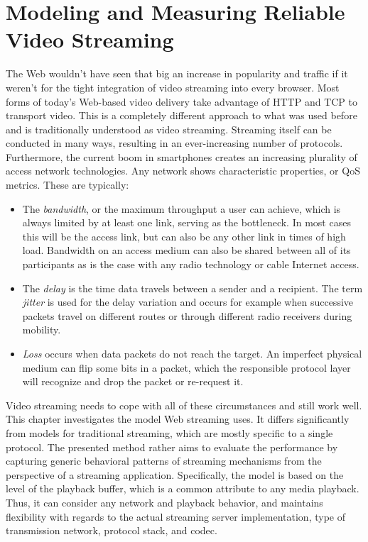 \chapter{Modeling and Measuring Reliable Video Streaming}
\label{chap:streaming}



The Web wouldn't have seen that big an increase in popularity and traffic if it weren't for the tight integration of video streaming into every browser. Most forms of today's Web-based video delivery take advantage of \gls{HTTP} and \gls{TCP} to transport video. This is a completely different approach to what was used before and is traditionally understood as video streaming. 
Streaming itself can be conducted in many ways, resulting in an ever-increasing number of protocols. Furthermore, the current boom in smartphones creates an increasing plurality of access network technologies.
Any network shows characteristic properties, or \gls{QoS} metrics. These are typically:
\begin{itemize}
\item The \textit{bandwidth}, or the maximum throughput a user can achieve, which is always limited by at least one link, serving as the bottleneck. In most cases this will be the access link, but can also be any other link in times of high load. Bandwidth on an access medium can also be shared between all of its participants as is the case with any radio technology or cable Internet access.
\item The \textit{delay} is the time data travels between a sender and a recipient. The term \textit{jitter} is used  for the delay variation and occurs for example when successive packets travel on different routes or through different radio receivers during mobility.
\item \textit{Loss} occurs when data packets do not reach the target. An imperfect physical medium can flip some bits in a packet, which the responsible protocol layer will recognize and drop the packet or re-request it.
\end{itemize}

Video streaming needs to cope with all of these circumstances and still work well. This chapter investigates the model Web streaming uses. It differs significantly from models for traditional streaming, which are mostly specific to a single protocol.
The presented method rather aims to evaluate the performance by capturing generic behavioral patterns of streaming mechanisms from the perspective of a streaming application. Specifically, the model is based on the level of the playback buffer, which is a common attribute to any media playback.
Thus, it can consider any network and playback behavior, and maintains flexibility with regards to the actual streaming server implementation, type of transmission network, protocol stack, and codec.

